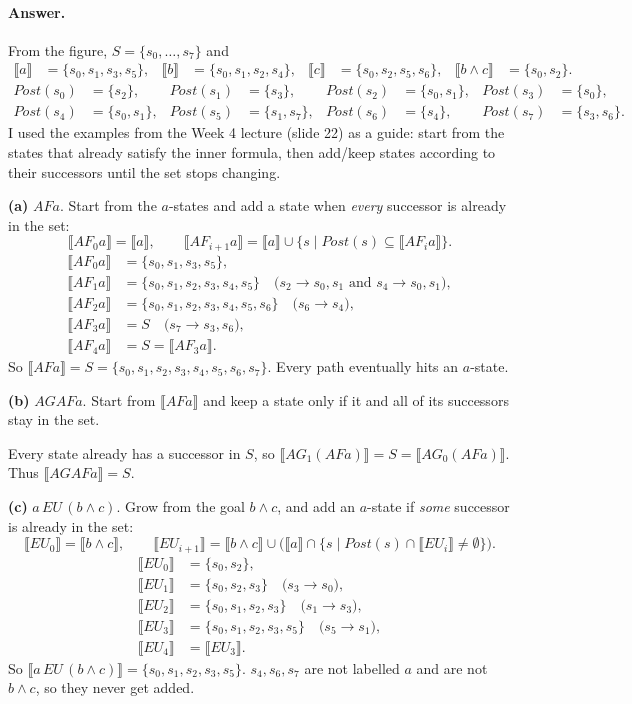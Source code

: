 \documentclass{article}
\newcommand{\set}[1]{\{#1\}}
\newcommand{\sem}[1]{\llbracket #1\rrbracket}
\begin{document}
\paragraph{Answer.}
From the figure, $S=\set{s_0,\dots,s_7}$ and
\begin{align*}
\sem{a}&=\set{s_0,s_1,s_3,s_5},&
\sem{b}&=\set{s_0,s_1,s_2,s_4},&
\sem{c}&=\set{s_0,s_2,s_5,s_6},&
\sem{b\wedge c}&=\set{s_0,s_2}.
\end{align*}
\begin{align*}
\mathit{Post}(s_0)&=\set{s_2},&
\mathit{Post}(s_1)&=\set{s_3},&
\mathit{Post}(s_2)&=\set{s_0,s_1},&
\mathit{Post}(s_3)&=\set{s_0},\\
\mathit{Post}(s_4)&=\set{s_0,s_1},&
\mathit{Post}(s_5)&=\set{s_1,s_7},&
\mathit{Post}(s_6)&=\set{s_4},&
\mathit{Post}(s_7)&=\set{s_3,s_6}.
\end{align*}
I used the examples from the Week 4 lecture (slide 22) as a guide: start from the states that already satisfy the inner formula, then add/keep states according to their successors until the set stops changing.

\medskip
\textbf{(a)} $AF a$. Start from the $a$-states and add a state when \emph{every} successor is already in the set:
\[
\sem{AF_0 a}=\sem{a},\qquad
\sem{AF_{i+1} a}=\sem{a}\cup\set{s\mid \mathit{Post}(s)\subseteq\sem{AF_i a}}.
\]
\begin{align*}
\sem{AF_0 a}&=\set{s_0,s_1,s_3,s_5},\\
\sem{AF_1 a}&=\set{s_0,s_1,s_2,s_3,s_4,s_5}
\quad\text{($s_2\to s_0,s_1$ and $s_4\to s_0,s_1$)},\\
\sem{AF_2 a}&=\set{s_0,s_1,s_2,s_3,s_4,s_5,s_6}
\quad\text{($s_6\to s_4$)},\\
\sem{AF_3 a}&=S
\quad\text{($s_7\to s_3,s_6$)},\\
\sem{AF_4 a}&=S=\sem{AF_3 a}.
\end{align*}
So $\sem{AF a}=S=\set{s_0,s_1,s_2,s_3,s_4,s_5,s_6,s_7}$. Every path eventually hits an $a$-state.

\medskip
\textbf{(b)} $AG AF a$. Start from $\sem{AF a}$ and keep a state only if it and all of its successors stay in the set.

Every state already has a successor in $S$, so $\sem{AG_1(AF a)}=S=\sem{AG_0(AF a)}$. Thus $\sem{AG AF a}=S$.

\medskip
\textbf{(c)} $a\,EU\,(b\wedge c)$. Grow from the goal $b\wedge c$, and add an $a$-state if \emph{some} successor is already in the set:
\[
\sem{EU_0}=\sem{b\wedge c},\qquad
\sem{EU_{i+1}}=\sem{b\wedge c}\cup\bigl(\sem{a}\cap\set{s\mid \mathit{Post}(s)\cap\sem{EU_i}\neq\emptyset}\bigr).
\]
\begin{align*}
\sem{EU_0}&=\set{s_0,s_2},\\
\sem{EU_1}&=\set{s_0,s_2,s_3}
\quad\text{($s_3\to s_0$)},\\
\sem{EU_2}&=\set{s_0,s_1,s_2,s_3}
\quad\text{($s_1\to s_3$)},\\
\sem{EU_3}&=\set{s_0,s_1,s_2,s_3,s_5}
\quad\text{($s_5\to s_1$)},\\
\sem{EU_4}&=\sem{EU_3}.
\end{align*}
So $\sem{a\,EU\,(b\wedge c)}=\set{s_0,s_1,s_2,s_3,s_5}$. $s_4,s_6,s_7$ are not labelled $a$ and are not $b\wedge c$, so they never get added.
\end{document}
